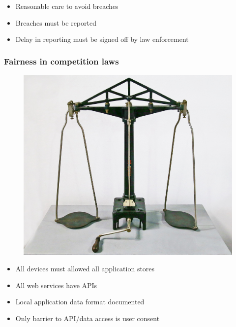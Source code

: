 \begin{itemize}
\item Reasonable care to avoid breaches
\item Breaches must be reported
\item Delay in reporting must be signed off by law enforcement
\end{itemize}

\begin{frame}[fragile]
\frametitle{Fairness in competition laws}


\begin{figure}
\includegraphics[scale=0.1]{scale}
\end{figure}

\end{frame}


\begin{itemize}
\item All devices must allowed all application stores
\item All web services have APIs
\item Local application data format documented
\item Only barrier to API/data access is user consent
\end{itemize}

